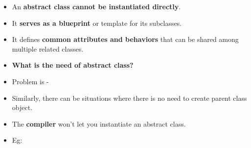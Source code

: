 \setlength{\columnsep}{3pt}
\begin{flushleft}

	\begin{itemize}
		\item An \textbf{abstract class cannot be instantiated directly}.
		\item It \textbf{serves as a blueprint} or template for its subclasses. 
		\item It defines \textbf{common attributes and behaviors} that can be shared among multiple related classes. 
		
		\bigskip
		\item \textbf{What is the need of abstract class?}
		
		\newpage
		\item Problem is -
		
		\item Similarly, there can be situations where there is no need to create parent class object.
		
		\item The \textbf{compiler} won’t let you instantiate an abstract class.

		\bigskip
		\bigskip
		
		\item Eg:
		\bigskip
		
	\end{itemize}
	
		
\end{flushleft}

\newpage



